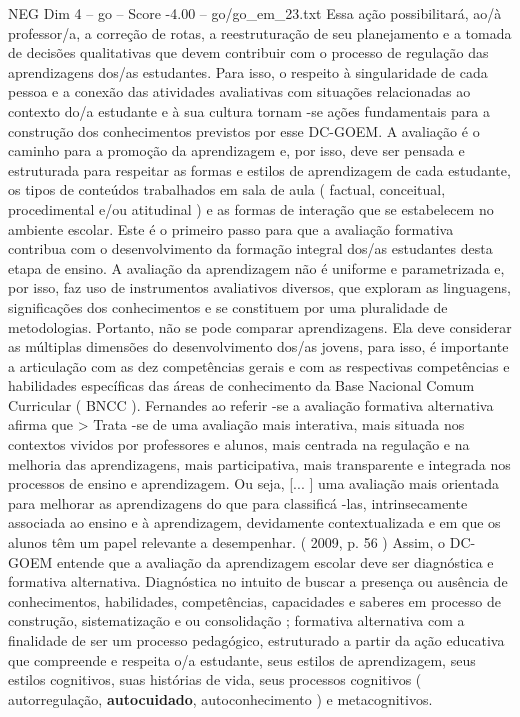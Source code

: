 \begin{textsample}{NEG Dim 4 – go – Score -4.00 – go/go\_em\_23.txt}
Essa ação possibilitará, ao/à professor/a, a correção de rotas, a reestruturação de seu planejamento e a tomada de decisões qualitativas que devem contribuir com o processo de regulação das aprendizagens dos/as estudantes.
Para isso, o respeito à singularidade de cada pessoa e a conexão das atividades avaliativas com situações relacionadas ao contexto do/a estudante e à sua cultura tornam -se ações fundamentais para a construção dos conhecimentos previstos por esse DC-GOEM.
A avaliação é o caminho para a promoção da aprendizagem e, por isso, deve ser pensada e estruturada para respeitar as formas e estilos de aprendizagem de cada estudante, os tipos de conteúdos trabalhados em sala de aula ( factual, conceitual, procedimental e/ou atitudinal ) e as formas de interação que se estabelecem no ambiente escolar.
Este é o primeiro passo para que a avaliação formativa contribua com o desenvolvimento da formação integral dos/as estudantes desta etapa de ensino.
A avaliação da aprendizagem não é uniforme e parametrizada e, por isso, faz uso de instrumentos avaliativos diversos, que exploram as linguagens, significações dos conhecimentos e se constituem por uma pluralidade de metodologias.
Portanto, não se pode comparar aprendizagens.
Ela deve considerar as múltiplas dimensões do desenvolvimento dos/as jovens, para isso, é importante a articulação com as dez competências gerais e com as respectivas competências e habilidades específicas das áreas de conhecimento da Base Nacional Comum Curricular ( BNCC ).
Fernandes ao referir -se a avaliação formativa alternativa afirma que > Trata -se de uma avaliação mais interativa, mais situada nos contextos vividos por professores e alunos, mais centrada na regulação e na melhoria das aprendizagens, mais participativa, mais transparente e integrada nos processos de ensino e aprendizagem.
Ou seja, [... ] uma avaliação mais orientada para melhorar as aprendizagens do que para classificá -las, intrinsecamente associada ao ensino e à aprendizagem, devidamente contextualizada e em que os alunos têm um papel relevante a desempenhar. ( 2009, p. 56 ) Assim, o DC-GOEM entende que a avaliação da aprendizagem escolar deve ser diagnóstica e formativa alternativa.
Diagnóstica no intuito de buscar a presença ou ausência de conhecimentos, habilidades, competências, capacidades e saberes em processo de construção, sistematização e ou consolidação ; formativa alternativa com a finalidade de ser um processo pedagógico, estruturado a partir da ação educativa que compreende e respeita o/a estudante, seus estilos de aprendizagem, seus estilos cognitivos, suas histórias de vida, seus processos cognitivos ( autorregulação, \textbf{autocuidado}, autoconhecimento ) e metacognitivos.

\end{textsample}
